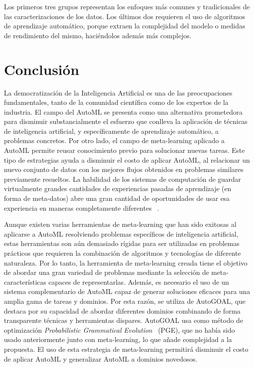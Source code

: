 Los primeros tres grupos representan los enfoques más comunes y tradicionales
de las caracterizaciones de los datos. Los últimos dos requieren el uso de
algoritmos de aprendizaje automático, porque extraen la complejidad del modelo
o medidas de rendimiento del mismo, haciéndolos además más complejos.

\section{Conclusión}\label{sec:conclusion}

La democratización de la Inteligencia Artificial es una de las preocupaciones
fundamentales, tanto de la comunidad científica como de los expertos de la
industria. El campo del AutoML se presenta como una alternativa prometedora
para disminuir substancialmente el esfuerzo que conlleva la aplicación de
técnicas de inteligencia artificial, y específicamente de aprendizaje
automático, a problemas concretos. Por otro lado, el campo de meta-learning
aplicado a AutoML permite reusar conocimiento previo para solucionar nuevas
tareas. Este tipo de estrategias ayuda a disminuir el costo de aplicar AutoML,
al relacionar un nuevo conjunto de datos con los mejores flujos obtenidos en
problemas similares previamente resueltos. La habilidad de los sistemas de
computación de guardar virtualmente grandes cantidades de experiencias pasadas
de aprendizaje (en forma de meta-datos) abre una gran cantidad de oportunidades
de usar esa experiencia en maneras completamente diferentes
~.

Aunque existen varias herramientas de meta-learning que han sido exitosas al
aplicarse a AutoML resolviendo problemas específicos de inteligencia
artificial, estas herramientas son aún demasiado rígidas para ser utilizadas
en problemas prácticos que requieren la combinación de algoritmos y tecnologías
de diferente naturaleza. Por lo tanto, la herramienta de meta-learning creada
tiene el objetivo de abordar una gran variedad de problemas mediante la
selección de meta-características capaces de representarlas. Además, es
necesario el uso de un sistema complementario de AutoML capaz de generar
soluciones eficaces para una amplia gama de tareas y dominios. Por esta razón,
se utiliza de AutoGOAL, que destaca por su
capacidad de abordar diferentes dominios combinando de forma transparente
técnicas y herramientas dispares. AutoGOAL usa como método de optimización
\textit{Probabilistic Grammatical Evolution}~ (PGE),
que no había sido usado anteriormente junto con meta-learning, lo que añade
complejidad a la propuesta. El uso de esta estrategia de meta-learning
permitirá disminuir el costo de aplicar AutoML y generalizar AutoML a dominios
novedosos.
